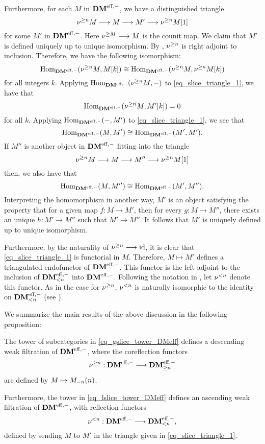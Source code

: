 Furthermore, for each $M$ in $\DMeff$, we have a distinguished 
triangle
\begin{equation}\label{eq_slice_triangle_1}
\sgDM{n}M \to M \to M' \to \sgDM{n}M[1]
\end{equation}
for some $M'$ in $\DMeff$. Here $\sgDM{M} \to M$ is the 
counit map. We claim that $M'$ is defined uniquely up to unique
isomorphism. By \cite[1.1]{HuKa}, $\sgDM{n}$ is right adjoint to 
inclusion. Therefore, we have the following isomorphism:
\[
\homDMf(\sgDM{n}M, M[k]) \cong \homDMf(\sgDM{n}M, \sgDM{n}M[k])
\]
for all integers $k$. Applying $\homDMf(\sgDM{n}M, -)$ to 
\eqref{eq_slice_triangle_1}, we have that
\[
\homDMf(\sgDM{n}M, M'[k]) = 0
\]
for all $k$. Applying $\homDMf(-,M')$ to 
\eqref{eq_slice_triangle_1}, we see that 
\[
\homDMf(M, M') \cong \homDMf(M', M').
\]
If $M''$ is another object in $\DMeff$ fitting into the triangle
\[
\sgDM{n}M \to M \to M'' \to \sgDM{n}M[1]
\]
then, we also have that
\[
\homDMf(M, M'') \cong \homDMf(M',M'').
\]
Interpreting the homomorphism in another way, $M'$ is an object
satisfying the property that for a given map $f: M \to M'$, then
for every $g: M \to M''$, there exists an unique $h: M' \to M''$ 
such that $M' \to M''$. It follows that $M'$ is uniquely defined 
up to unique isomorphism.

Furthermore, by the naturality of $\sgDM{n} \to \id$, it is clear 
that \eqref{eq_slice_triangle_1} is functorial in $M$. Therefore,
$M \mapsto M'$ defines a triangulated endofunctor of $\DMeff$.
This functor is the left adjoint to the inclusion of 
$\LFiltDM[n]{\DMeff}$ into $\DMeff$. Following the notation in 
\cite{HuKa}, let $\slDM{n}$ denote this functor. As in the case 
for $\sgDM{n}$, $\slDM{n}$ is naturally isomorphic to the identity 
on $\LFiltDM[n]{\DMeff}$ (see \cite[1.4i, ii]{HuKa}). 

We summarize the main results of the above discussion in the 
following proposition:

\begin{prop}\label{prop_slice_DMeff}
The tower of subcategories in \eqref{eq_gslice_tower_DMeff} 
defines a descending weak filtration of $\DMeff$, where the
coreflection functors
\[
\sgDM{n}: \DMeff \to \GFiltDM[n]{\DMeff}
\] 
are defined by $M \mapsto \tZ[n]{\hZ[n]{M}}$.

Furthermore, the tower in \eqref{eq_lslice_tower_DMeff}
defines an ascending weak filtration of $\DMeff$, with
reflection functors 
\[
\slDM{n}: \DMeff \to \LFiltDM[n]{\DMeff},
\]
defined by sending $M$ to $M'$ in the triangle given in 
\eqref{eq_slice_triangle_1}.
\end{prop}

